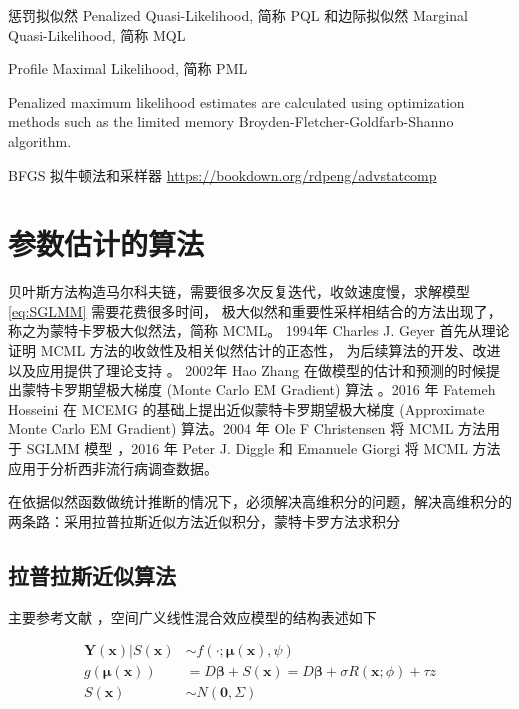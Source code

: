 \documentclass[12pt,a4paper,UTF8,twoside]{book}
\theoremstyle{definition}
\theoremstyle{definition}
\theoremstyle{definition}
\theoremstyle{remark}
\begin{document}
惩罚拟似然 Penalized Quasi-Likelihood, 简称 PQL 和边际拟似然 Marginal
Quasi-Likelihood, 简称 MQL

Profile Maximal Likelihood, 简称 PML

Penalized maximum likelihood estimates are calculated using optimization
methods such as the limited memory Broyden-Fletcher-Goldfarb-Shanno
algorithm.

BFGS 拟牛顿法和采样器 \url{https://bookdown.org/rdpeng/advstatcomp}

\hypertarget{algrithms}{%
\section{参数估计的算法}\label{algrithms}}

贝叶斯方法构造马尔科夫链，需要很多次反复迭代，收敛速度慢，求解模型
\eqref{eq:SGLMM} 需要花费很多时间，
极大似然和重要性采样相结合的方法出现了，称之为蒙特卡罗极大似然法，简称
MCML。 1994年 Charles J. Geyer 首先从理论证明 MCML
方法的收敛性及相关似然估计的正态性，
为后续算法的开发、改进以及应用提供了理论支持 \citep{Geyer1994On}。
2002年 Hao Zhang 在做模型的估计和预测的时候提出蒙特卡罗期望极大梯度
(Monte Carlo EM Gradient) 算法 \citep{Zhang2002On}。2016 年 Fatemeh
Hosseini 在 MCEMG 的基础上提出近似蒙特卡罗期望极大梯度 (Approximate
Monte Carlo EM Gradient) 算法\citep{Hosseini2016}。2004 年 Ole F
Christensen 将 MCML 方法用于 SGLMM 模型 \citep{Christensen2004}，2016 年
Peter J. Diggle 和 Emanuele Giorgi 将 MCML
方法应用于分析西非流行病调查数据。

在依据似然函数做统计推断的情况下，必须解决高维积分的问题，解决高维积分的两条路：采用拉普拉斯近似方法近似积分，蒙特卡罗方法求积分

\hypertarget{LA}{%
\subsection{拉普拉斯近似算法}\label{LA}}

主要参考文献
\citep{Bonat2016Practical}，空间广义线性混合效应模型的结构表述如下

\begin{equation}
\begin{aligned}
\mathbf{Y(x)} | S(\mathbf{x}) & \sim  f(\cdot;\boldsymbol{\mu(x)},\psi) \\
g(\boldsymbol{\mu(x)}) & =  D\boldsymbol{\beta} + S(\mathbf{x}) 
                         = D\boldsymbol{\beta} + \sigma R(\mathbf{x};\phi) + \tau z \\
S(\mathbf{x}) & \sim  N(\mathbf{0},\Sigma)
\end{aligned} \label{eq:sglmm}
\end{equation}
\end{document}
